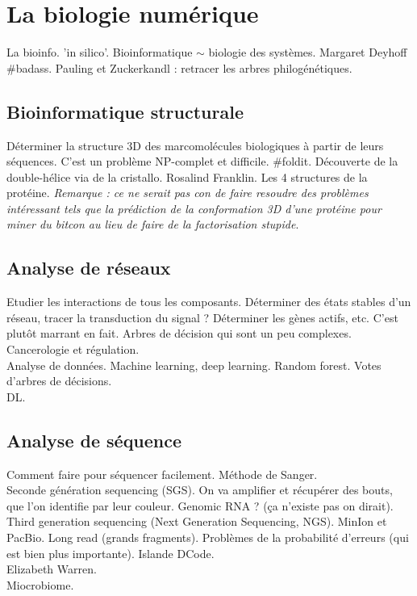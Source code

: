 \documentclass[10pt,a4paper]{article}
\begin{document}
\section{La biologie numérique}
La bioinfo. 'in silico'. Bioinformatique $\sim$ biologie des systèmes. Margaret Deyhoff \#badass. Pauling et Zuckerkandl : retracer les arbres philogénétiques.

\subsection{Bioinformatique structurale}
Déterminer la structure 3D des marcomolécules biologiques à partir de leurs séquences. C'est un problème NP-complet et difficile. \#foldit. Découverte de la double-hélice via de la cristallo. Rosalind Franklin. Les 4 structures de la protéine. \textit{Remarque : ce ne serait pas con de faire resoudre des problèmes intéressant tels que la prédiction de la conformation 3D d'une protéine pour miner du bitcon au lieu de faire de la factorisation stupide}. \\

\subsection{Analyse de réseaux}
Etudier les interactions de tous les composants. Déterminer des états stables d'un réseau, tracer la transduction du signal ? Déterminer les gènes actifs, etc. C'est plutôt marrant en fait. Arbres de décision qui sont un  peu complexes. Cancerologie et régulation.\\

Analyse de données. Machine learning, deep learning. Random forest. Votes d'arbres de décisions.\\

DL.\\

\subsection{Analyse de séquence}
Comment faire pour séquencer facilement. Méthode de Sanger.\\
Seconde génération sequencing (SGS). On va amplifier et récupérer des bouts, que l'on identifie par leur couleur. Genomic RNA ? (ça n'existe pas on dirait).\\
Third generation sequencing (Next Generation Sequencing, NGS). MinIon et PacBio. Long read (grands fragments). Problèmes de la probabilité d'erreurs (qui est bien plus importante). Islande DCode.\\
Elizabeth Warren.\\
Miocrobiome.\\
\end{document}
